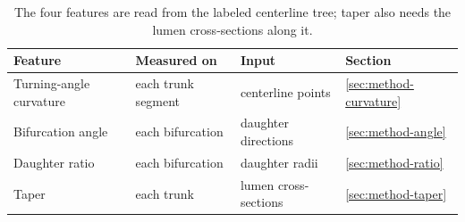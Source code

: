 \begin{table}[htbp]
  \centering
  \caption{The four features are read from the labeled centerline tree; taper also needs the lumen cross-sections along it.}
  \label{tab:method-features}
  \begin{tabular}{llll}
    \toprule
    Feature & Measured on & Input & Section \\
    \midrule
    Turning-angle curvature & each trunk segment & centerline points & \ref{sec:method-curvature} \\
    Bifurcation angle & each bifurcation & daughter directions & \ref{sec:method-angle} \\
    Daughter ratio & each bifurcation & daughter radii & \ref{sec:method-ratio} \\
    Taper & each trunk & lumen cross-sections & \ref{sec:method-taper} \\
    \bottomrule
  \end{tabular}
\end{table}
